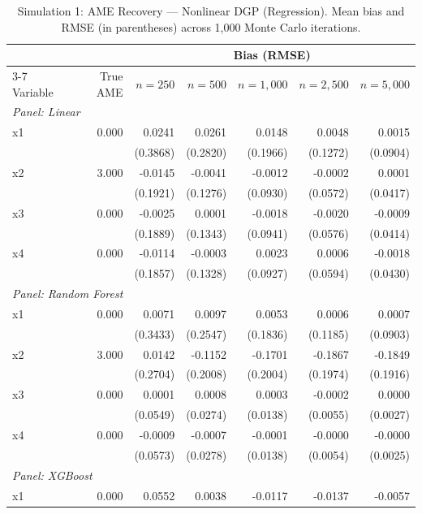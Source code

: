 \begin{table}[htbp]
\centering
\small
\begin{threeparttable}
\caption{Simulation 1: AME Recovery --- Nonlinear DGP (Regression). Mean bias and RMSE (in parentheses) across 1,000 Monte Carlo iterations.}
\label{tab:sim1_regression_nonlinear}
\begin{tabular}{lrrrrrr}
\toprule
 & & \multicolumn{5}{c}{Bias (RMSE)} \\
\cmidrule(lr){3-7}
Variable & True AME & $n=250$ & $n=500$ & $n=1,000$ & $n=2,500$ & $n=5,000$ \\
\midrule
\multicolumn{7}{l}{\textit{Panel: Linear}} \\
\quad x1 & 0.000 & 0.0241 & 0.0261 & 0.0148 & 0.0048 & 0.0015 \\
 &  & (0.3868) & (0.2820) & (0.1966) & (0.1272) & (0.0904) \\
\quad x2 & 3.000 & -0.0145 & -0.0041 & -0.0012 & -0.0002 & 0.0001 \\
 &  & (0.1921) & (0.1276) & (0.0930) & (0.0572) & (0.0417) \\
\quad x3 & 0.000 & -0.0025 & 0.0001 & -0.0018 & -0.0020 & -0.0009 \\
 &  & (0.1889) & (0.1343) & (0.0941) & (0.0576) & (0.0414) \\
\quad x4 & 0.000 & -0.0114 & -0.0003 & 0.0023 & 0.0006 & -0.0018 \\
 &  & (0.1857) & (0.1328) & (0.0927) & (0.0594) & (0.0430) \\
\midrule
\multicolumn{7}{l}{\textit{Panel: Random Forest}} \\
\quad x1 & 0.000 & 0.0071 & 0.0097 & 0.0053 & 0.0006 & 0.0007 \\
 &  & (0.3433) & (0.2547) & (0.1836) & (0.1185) & (0.0903) \\
\quad x2 & 3.000 & 0.0142 & -0.1152 & -0.1701 & -0.1867 & -0.1849 \\
 &  & (0.2704) & (0.2008) & (0.2004) & (0.1974) & (0.1916) \\
\quad x3 & 0.000 & 0.0001 & 0.0008 & 0.0003 & -0.0002 & 0.0000 \\
 &  & (0.0549) & (0.0274) & (0.0138) & (0.0055) & (0.0027) \\
\quad x4 & 0.000 & -0.0009 & -0.0007 & -0.0001 & -0.0000 & -0.0000 \\
 &  & (0.0573) & (0.0278) & (0.0138) & (0.0054) & (0.0025) \\
\midrule
\multicolumn{7}{l}{\textit{Panel: XGBoost}} \\
\quad x1 & 0.000 & 0.0552 & 0.0038 & -0.0117 & -0.0137 & -0.0057 \\

\end{tabular}
\end{threeparttable}
\end{table}
